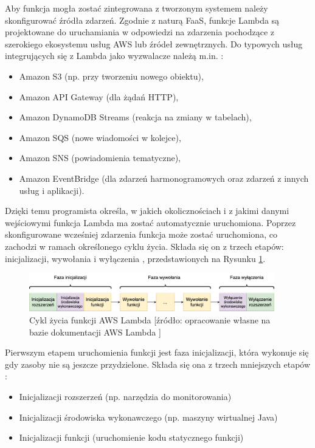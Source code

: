 Aby funkcja mogła zostać zintegrowana z tworzonym systemem należy skonfigurować źródła zdarzeń.
Zgodnie z naturą FaaS, funkcje Lambda są projektowane do uruchamiania w odpowiedzi na zdarzenia pochodzące z szerokiego ekosystemu usług AWS lub źródeł zewnętrznych.
Do typowych usług integrujących się z Lambda jako wyzwalacze należą m.in. \cite{awsLambdaDocs}:
\begin{itemize}
    \item Amazon S3 (np. przy tworzeniu nowego obiektu),
    \item Amazon API Gateway (dla żądań HTTP),
    \item Amazon DynamoDB Streams (reakcja na zmiany w tabelach),
    \item Amazon SQS (nowe wiadomości w kolejce),
    \item Amazon SNS (powiadomienia tematyczne),
    \item Amazon EventBridge (dla zdarzeń harmonogramowych oraz zdarzeń z innych usług i aplikacji).
\end{itemize}
Dzięki temu programista określa, w jakich okolicznościach i z jakimi danymi wejściowymi funkcja Lambda ma zostać automatycznie uruchomiona.
Poprzez skonfigurowane wcześniej zdarzenia funkcja może zostać uruchomiona, co zachodzi w ramach określonego cyklu życia.
Składa się on z trzech etapów: inicjalizacji, wywołania i wyłączenia \cite{awsLambdaDocs}, przedstawionych na Rysunku \ref{fig:aws_lambda_lifecycle}.

\begin{figure}[h]
    \centering
    \includegraphics[width=0.95\textwidth]{charts/aws_lambda_lifecycle.drawio.png}
    \caption{Cykl życia funkcji AWS Lambda [źródło: opracowanie własne na bazie dokumentacji AWS Lambda \cite{awsLambdaDocs}]}
    \label{fig:aws_lambda_lifecycle}    
\end{figure}

Pierwszym etapem uruchomienia funkcji jest faza inicjalizacji, która wykonuje się gdy zasoby nie są jeszcze przydzielone.
Składa się ona z trzech mniejszych etapów \cite{awsLambdaDocs}: 
\begin{itemize}
    \item Inicjalizacji rozszerzeń (np. narzędzia do monitorowania)
    \item Inicjalizacji środowiska wykonawczego (np. maszyny wirtualnej Java)
    \item Inicjalizacji funkcji (uruchomienie kodu statycznego funkcji)
\end{itemize}

